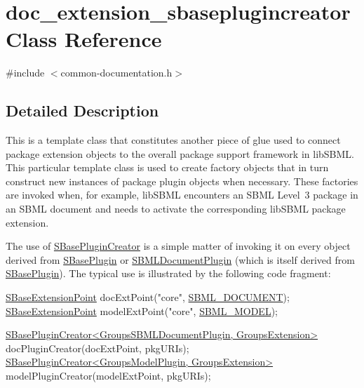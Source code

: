 \hypertarget{classdoc__extension__sbaseplugincreator}{}\section{doc\+\_\+extension\+\_\+sbaseplugincreator Class Reference}
\label{classdoc__extension__sbaseplugincreator}


{\ttfamily \#include $<$common-\/documentation.\+h$>$}



\subsection{Detailed Description}
\begin{DoxyParagraph}{}
This is a template class that constitutes another piece of glue used to connect package extension objects to the overall package support framework in lib\+S\+B\+ML. This particular template class is used to create factory objects that in turn construct new instances of package plugin objects when necessary. These factories are invoked when, for example, lib\+S\+B\+ML encounters an S\+B\+ML Level~3 package in an S\+B\+ML document and needs to activate the corresponding lib\+S\+B\+ML package extension.
\end{DoxyParagraph}
The use of \hyperlink{class_s_base_plugin_creator}{S\+Base\+Plugin\+Creator} is a simple matter of invoking it on every object derived from \hyperlink{class_s_base_plugin}{S\+Base\+Plugin} or \hyperlink{class_s_b_m_l_document_plugin}{S\+B\+M\+L\+Document\+Plugin} (which is itself derived from \hyperlink{class_s_base_plugin}{S\+Base\+Plugin}). The typical use is illustrated by the following code fragment\+:


\begin{DoxyCode}
\hyperlink{class_s_base_extension_point}{SBaseExtensionPoint} docExtPoint(\textcolor{stringliteral}{"core"}, \hyperlink{_s_b_m_l_type_codes_8h_aa283dddfd7671179362b2f38e2938cfeabfe976c674a5a708c1373dfdfa3bfa63}{SBML\_DOCUMENT});
\hyperlink{class_s_base_extension_point}{SBaseExtensionPoint} modelExtPoint(\textcolor{stringliteral}{"core"}, \hyperlink{_s_b_m_l_type_codes_8h_aa283dddfd7671179362b2f38e2938cfea3c866be107d7858b6dd1e978ed103028}{SBML\_MODEL});

\hyperlink{class_s_base_plugin_creator}{SBasePluginCreator<GroupsSBMLDocumentPlugin, GroupsExtension>}
       docPluginCreator(docExtPoint, pkgURIs);
\hyperlink{class_s_base_plugin_creator}{SBasePluginCreator<GroupsModelPlugin, GroupsExtension>}
       modelPluginCreator(modelExtPoint, pkgURIs);
\end{DoxyCode}


